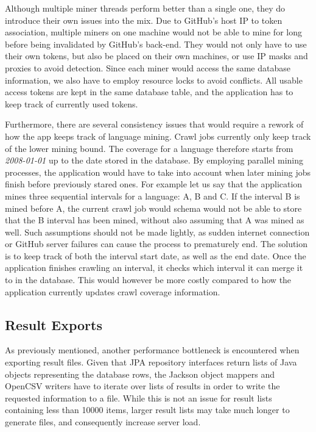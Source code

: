 Although multiple miner threads perform better than a single one, they do introduce their own issues into the mix.
Due to GitHub's host IP to token association, multiple miners on one machine would not be able to mine for long before being invalidated by GitHub's back-end.
They would not only have to use their own tokens, but also be placed on their own machines, or use IP masks and proxies to avoid detection.
Since each miner would access the same database information, we also have to employ resource locks to avoid conflicts.
All usable access tokens are kept in the same database table, and the application has to keep track of currently used tokens.

Furthermore, there are several consistency issues that would require a rework of how the app keeps track of language mining.
Crawl jobs currently only keep track of the lower mining bound.
The coverage for a language therefore starts from \textit{2008-01-01} up to the date stored in the database.
By employing parallel mining processes, the application would have to take into account when later mining jobs finish before previously stared ones.
For example let us say that the application mines three sequential intervals for a language: A, B and C\@.
If the interval B is mined before A, the current crawl job would schema would not be able to store that the B interval has been mined, without also assuming that A was mined as well.
Such assumptions should not be made lightly, as sudden internet connection or GitHub server failures can cause the process to prematurely end.
The solution is to keep track of both the interval start date, as well as the end date.
Once the application finishes crawling an interval, it checks which interval it can merge it to in the database.
This would however be more costly compared to how the application currently updates crawl coverage information.

\subsection{Result Exports}

As previously mentioned, another performance bottleneck is encountered when exporting result files.
Given that JPA repository interfaces return lists of Java objects representing the database rows, the Jackson object mappers and OpenCSV writers have to iterate over lists of results in order to write the requested information to a file.
While this is not an issue for result lists containing less than 10000 items, larger result lists may take much longer to generate files, and consequently increase server load.

